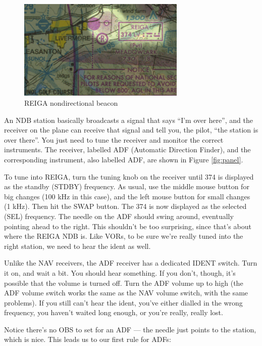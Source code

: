 
\begin{figure}
  \begin{center}
    \includegraphics[width=8cm]{img/NDB.png}
    \caption{REIGA nondirectional beacon}
    \label{fig:NDB}
  \end{center}
\end{figure}

An NDB station basically broadcasts a signal that says ``I'm over
here'', and the receiver on the plane can receive that signal and tell
you, the pilot, ``the station is over there''.  You just need to tune
the receiver and monitor the correct instruments.  The receiver,
labelled ADF (Automatic Direction Finder), and the corresponding
instrument, also labelled ADF, are shown in Figure \ref{fig:panel}.

To tune into REIGA, turn the tuning knob on the receiver until 374 is
displayed as the standby (STDBY) frequency.  As usual, use the middle
mouse button for big changes (100 kHz in this case), and the left
mouse button for small changes (1 kHz).  Then hit the SWAP button.
The 374 is now displayed as the selected (SEL) frequency.  The needle
on the ADF should swing around, eventually pointing ahead to the
right.  This shouldn't be too surprising, since that's about where the
REIGA NDB is.  Like VORs, to be sure we're really tuned into the right
station, we need to hear the ident as well.

Unlike the NAV receivers, the ADF receiver has a dedicated IDENT
switch.  Turn it on, and wait a bit.  You should hear something.  If
you don't, though, it's possible that the volume is turned off.  Turn
the ADF volume up to high (the ADF volume switch works the same as the
NAV volume switch, with the same problems).  If you still can't hear
the ident, you've either dialled in the wrong frequency, you haven't
waited long enough, or you're really, really lost.

Notice there's no OBS to set for an ADF --- the needle just points to
the station, which is nice.  This leads us to our first rule for ADFs:

